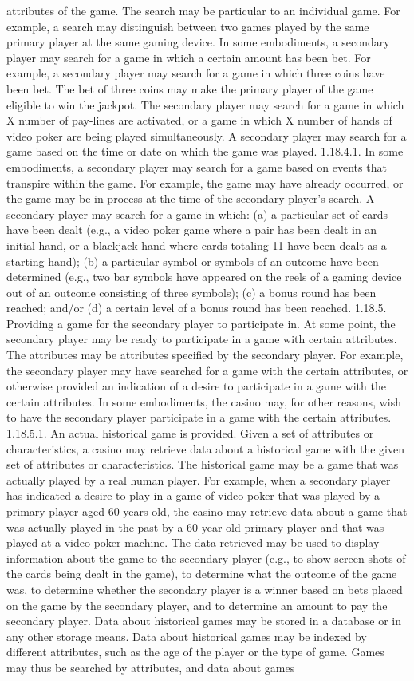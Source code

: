 \documentclass[11pt,a4paper]{article}
\begin{document}
attributes of the game. The search may be particular to an individual game. For example, a search may distinguish between two games played by the same primary player at the same gaming device. In some embodiments, a secondary player may search for a game in which a certain amount has been bet. For example, a secondary player may search for a game in which three coins have been bet. The bet of three coins may make the primary player of the game eligible to win the jackpot. The secondary player may search for a game in which X number of pay-lines are activated, or a game in which X number of hands of video poker are being played simultaneously. A secondary player may search for a game based on the time or date on which the game was played. 1.18.4.1. In some embodiments, a secondary player may search for a game based on events that transpire within the game. For example, the game may have already occurred, or the game may be in process at the time of the secondary player's search. A secondary player may search for a game in which: (a) a particular set of cards have been dealt (e.g., a video poker game where a pair has been dealt in an initial hand, or a blackjack hand where cards totaling 11 have been dealt as a starting hand); (b) a particular symbol or symbols of an outcome have been determined (e.g., two bar symbols have appeared on the reels of a gaming device out of an outcome consisting of three symbols); (c) a bonus round has been reached; and/or (d) a certain level of a bonus round has been reached. 1.18.5. Providing a game for the secondary player to participate in. At some point, the secondary player may be ready to participate in a game with certain attributes. The attributes may be attributes specified by the secondary player. For example, the secondary player may have searched for a game with the certain attributes, or otherwise provided an indication of a desire to participate in a game with the certain attributes. In some embodiments, the casino may, for other reasons, wish to have the secondary player participate in a game with the certain attributes. 1.18.5.1. An actual historical game is provided. Given a set of attributes or characteristics, a casino may retrieve data about a historical game with the given set of attributes or characteristics. The historical game may be a game that was actually played by a real human player. For example, when a secondary player has indicated a desire to play in a game of video poker that was played by a primary player aged 60 years old, the casino may retrieve data about a game that was actually played in the past by a 60 year-old primary player and that was played at a video poker machine. The data retrieved may be used to display information about the game to the secondary player (e.g., to show screen shots of the cards being dealt in the game), to determine what the outcome of the game was, to determine whether the secondary player is a winner based on bets placed on the game by the secondary player, and to determine an amount to pay the secondary player. Data about historical games may be stored in a database or in any other storage means. Data about historical games may be indexed by different attributes, such as the age of the player or the type of game. Games may thus be searched by attributes, and data about games 
\end{document}
